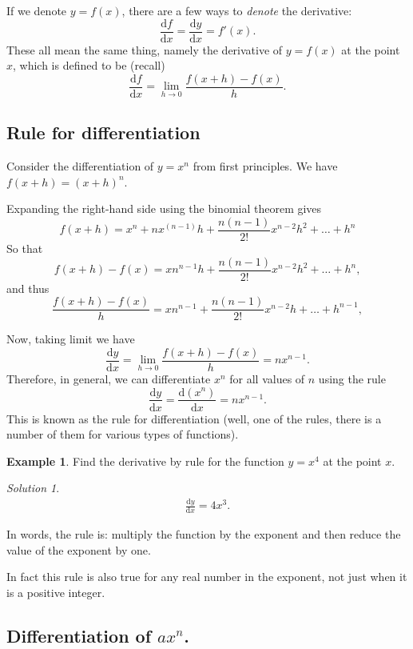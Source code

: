 \documentclass[
  11pt,
  oneside]{book}
\newcommand{\slide}{}
\theoremstyle{definition}
\theoremstyle{definition}
\newtheorem{example}{Example}[chapter]
\theoremstyle{definition}
\theoremstyle{definition}
\theoremstyle{remark}
\newtheorem*{solution}{Solution}
\begin{document}
If we denote \(y = f(x)\), there are a few ways to \emph{denote} the derivative:
\[
\frac{\mathrm{d} f}{\mathrm{d} x} = \frac{\mathrm{d} y}{\mathrm{d} x} = f'(x).
\]
These all mean the same thing, namely the derivative of \(y=f(x)\) at the point \(x\), which is defined to be (recall)
\[
\frac{\mathrm{d} f}{\mathrm{d} x} = \lim\limits_{h\to0}\frac{f(x+h)-f(x)}{h}.
\]

\slide

\subsection{Rule for differentiation}\label{rule-for-differentiation}

Consider the differentiation of \(y = x^n\) from first principles. We have \(f(x+h) = (x + h)^n\).

Expanding the right-hand side using the binomial theorem gives
\[
f(x+h) = x^n + nx^{(n-1)}h+\frac{n(n-1)}{2!}x^{n-2}h^2+\ldots+h^n
\]
So that
\[
f(x+h)-f(x) = xn^{n-1}h+\frac{n(n-1)}{2!}x^{n-2}h^2+\ldots + h^n,
\]
and thus
\[
\frac{f(x+h)-f(x)}{h} = xn^{n-1}+\frac{n(n-1)}{2!}x^{n-2}h+\ldots + h^{n-1},
\]
\slide
Now, taking limit we have
\[
\frac{\mathrm{d} y}{\mathrm{d} x} = \lim\limits_{h\to0}\frac{f(x+h)-f(x)}{h} = nx^{n-1}.
\]
Therefore, in general, we can differentiate \(x^n\) for all values of \(n\) using the rule
\[
\frac{\mathrm{d} y}{\mathrm{d} x} = \frac{\mathrm{d} (x^n)}{\mathrm{d} x} = nx^{n-1}.
\]
This is known as the rule for differentiation (well, one of the rules, there is a number of them for various types of functions).
\slide

\begin{example}
Find the derivative by rule for the function \(y = x^4\) at the point \(x\).
\end{example}

\begin{solution}
\begin{gather*}
\frac{\mathrm{d} y}{\mathrm{d} x} = 4x^3.
\end{gather*}
\end{solution}

In words, the rule is: multiply the function by the exponent and then reduce the value of the exponent by one.

In fact this rule is also true for any real number in the exponent, not just when it is a positive integer.

\slide

\subsection{\texorpdfstring{Differentiation of \(ax^n\).}{Differentiation of ax\^{}n.}}\label{differentiation-of-axn.}
\end{document}
